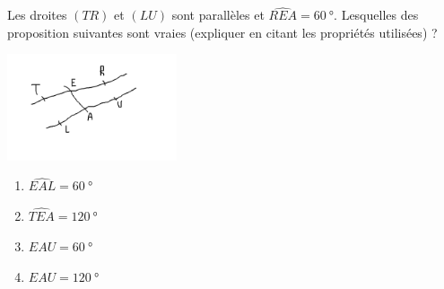 
\begin{exercice}\label{exo2smath-0098}

Les droites \( (TR)\) et \( (LU)\) sont parallèles et \( \widehat{REA}=\SI{60}{\degree}\). Lesquelles des proposition suivantes sont vraies (expliquer en citant les propriétés utilisées) ?

\includegraphics[width=5cm]{faux_angles.pdf}

\begin{multicols}{2}
\begin{enumerate}
    \item
        \( \widehat{EAL}=\SI{60}{\degree}\)
    \item
        \( \widehat{TEA}=\SI{120}{\degree}\)
    \item
        \( \widehat{EAU}=\SI{60}{\degree}\)
    \item
        \( \widehat{EAU}=\SI{120}{\degree}\)
\end{enumerate}
\end{multicols}


\end{exercice}
